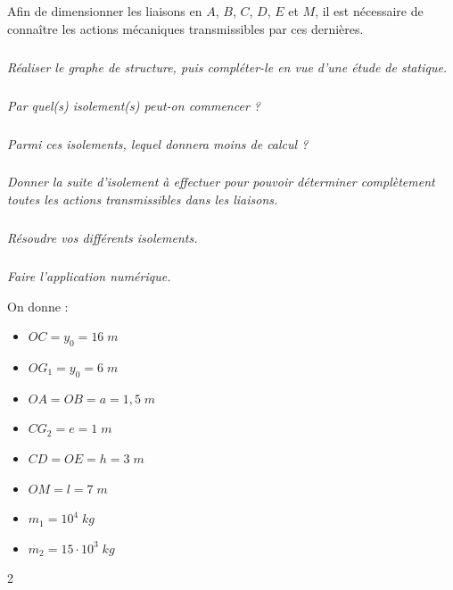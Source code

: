 \documentclass[10pt]{article}
\begin{document}
Afin de dimensionner les liaisons en $A$, $B$, $C$, $D$, $E$ et $M$, il est nécessaire de connaître les actions
mécaniques transmissibles par ces dernières.

\subparagraph{}
\textit{Réaliser le graphe de structure, puis compléter-le en vue d’une étude de statique.}

\subparagraph{}
\textit{Par quel(s) isolement(s) peut-on commencer ?}

\subparagraph{}
\textit{Parmi ces isolements, lequel donnera moins de calcul ?}

\subparagraph{}
\textit{Donner la suite d’isolement à effectuer pour pouvoir déterminer complètement toutes
les actions transmissibles dans les liaisons.}

\subparagraph{}
\textit{Résoudre vos différents isolements.}

\subparagraph{}
\textit{Faire l’application numérique.}


On donne :
\begin{itemize}
\item $OC = y_0 = 16\; m$
\item $OG_1 = y_0 = 6\; m$
\item $OA=OB=a = 1,5\; m$
\item $CG_2 = e = 1\; m$
\item $CD=OE = h = 3\; m$
\item $OM = l = 7\; m$
\item $m_1=10^4 \; kg$
\item $m_2=15 \cdot 10^3 \; kg$
\end{itemize}


\begin{thebibliography}{2}
\end{thebibliography}
\end{document}
